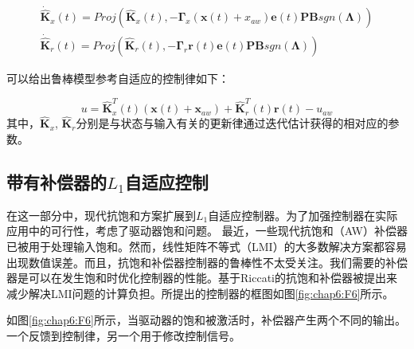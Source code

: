 \begin{equation}
\label{eq017}
\begin{array}{l}
{\dot{\hat{\bm K}}_x (t)}=Proj(\hat{\bm K}_x(t),-\bm{\Gamma}_x (\bm{x}(t) + x_{aw}) {\bm e}(t)\bm{PB}sgn(\bm \Lambda)) \\
{\dot{\hat{\bm K}}_r (t)}=Proj(\hat{\bm K}_r(t),-\bm{\Gamma}_r \bm{r}(t) {\bm e}(t)\bm{PB}sgn(\bm \Lambda))
\end{array}
\end{equation}

可以给出鲁棒模型参考自适应的控制律如下：

\begin{equation}
\label{eq014}
u = \hat{\bm{K}}_x ^{T}(t)(\bm{x}(t) + \bm{x}_{aw}) + \hat{\bm{K}}_r ^{T}(t)\bm{r}(t) - u_{aw}
\end{equation}
其中，$\hat{\bm{K}}_x$, $\hat{\bm{K}}_r$分别是与状态与输入有关的更新律通过迭代估计获得的相对应的参数。







\subsection{带有补偿器的$L_{1}$自适应控制 }

在这一部分中，现代抗饱和方案扩展到$L_1$自适应控制器。为了加强控制器在实际应用中的可行性，考虑了驱动器饱和问题。 最近，一些现代抗饱和（AW）补偿器已被用于处理输入饱和。然而，线性矩阵不等式（LMI）的大多数解决方案都容易出现数值误差\cite{galeani2009tutorial}。而且，抗饱和补偿器控制器的鲁棒性不太受关注。我们需要的补偿器是可以在发生饱和时优化控制器的性能。基于Riccati的抗饱和补偿器被提出来减少解决LMI问题的计算负担\cite{galeani2009tutorial,folcher2004lmi}。所提出的控制器的框图如图\ref{fig:chap6:F6}所示。

如图\ref{fig:chap6:F6}所示，当驱动器的饱和被激活时，补偿器产生两个不同的输出。一个反馈到控制律，另一个用于修改控制信号。


